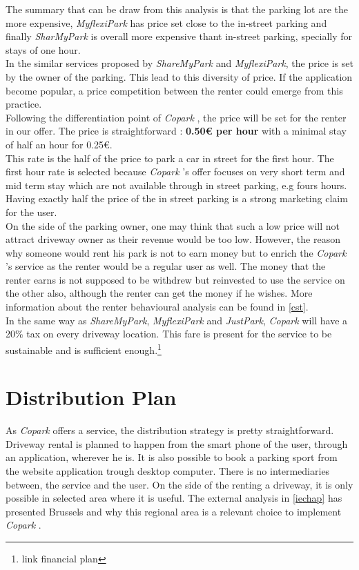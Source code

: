 \documentclass[12pt,a4paper,oneside]{book}
\newcommand{\bp}{\textit{Copark }}
\begin{document}
The summary that can be draw from this analysis is that the parking lot are the more expensive, \textit{MyflexiPark} has price set close to the in-street parking and finally \textit{SharMyPark} is overall more expensive thant in-street parking, specially for stays of one hour.\\

In the similar services proposed by \textit{ShareMyPark} and \textit{MyflexiPark}, the price is set by the owner of the parking. This lead to this diversity of price. If the application become popular, a price competition between the renter could emerge from this practice.\\

Following the differentiation point of \bp, the price will be set for the renter in our offer. The price is straightforward : \textbf{0.50\euro{} per hour} with a minimal stay of half an hour for 0.25\euro{}.\\
This rate is the half of the price to park a car in street for the first hour. The first hour rate is selected because \bp's offer focuses on very short term and mid term stay which are not available through in street parking, e.g fours hours.\\
Having exactly half the price of the in street parking is a strong marketing claim for the user.\\

On the side of the parking owner, one may think that such a low price will not attract driveway owner as their revenue would be too low. However, the reason why someone would rent his park is not to earn money but to enrich the \bp's service as the renter would be a regular user as well. The money that the renter earns is not supposed to be withdrew but reinvested to use the service on the other also, although the renter can get the money if he wishes. More information about the renter behavioural analysis can be found in \autoref{cst}.\\

In the same way as \textit{ShareMyPark}, \textit{MyflexiPark} and \textit{JustPark}, \bp will have a 20\% tax on every driveway location. This fare is present for the service to be sustainable and is sufficient enough.\footnote{link financial plan}

\section{Distribution Plan}

As \bp offers a service, the distribution strategy is pretty straightforward. Driveway rental is planned to happen from the smart phone of the user, through an application, wherever he is. It is also possible to book a parking sport from the website application trough desktop computer. There is no intermediaries between, the service and the user. On the side of the renting a driveway, it is only possible in selected area where it is useful. The external analysis in \autoref{iechap} has presented Brussels and why this regional area is a relevant choice to implement \bp.
\end{document}
